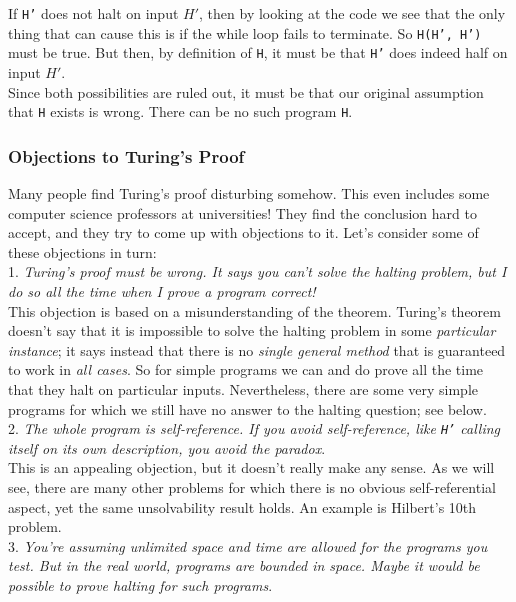 \documentclass[12pt]{article}
\theoremstyle{plain}
\theoremstyle{definition}
\begin{document}
If \texttt{H'} does not halt on input $H'$, then by looking at the code we see that the only thing that can cause this is if the while loop fails to terminate.
So \texttt{H(H', H')} must be true.
But then, by definition of \texttt{H}, it must be that \texttt{H'} does indeed half on input $H'$. \\

Since both possibilities are ruled out, it must be that our original assumption that \texttt{H} exists is wrong.
There can be no such program \texttt{H}.

\subsubsection{Objections to Turing's Proof}
Many people find Turing's proof disturbing somehow. This even includes some computer science professors at universities!
They find the conclusion hard to accept, and they try to come up with objections to it.
Let's consider some of these objections in turn: \\

1. \emph{Turing's proof must be wrong. It says you can't solve the halting problem, but I do so all the time when I prove a program correct!} \\

This objection is based on a misunderstanding of the theorem.
Turing's theorem doesn't say that it is impossible to solve the halting problem in some \emph{particular instance};
it says instead that there is no \emph{single general method} that is guaranteed to work in \emph{all cases}.
So for simple programs we can and do prove all the time that they halt on particular inputs.
Nevertheless, there are some very simple programs for which we still have no answer to the halting question;
see below. \\

2. \emph{The whole program is self-reference. If you avoid self-reference, like \texttt{H'} calling itself on its own description, you avoid the paradox}. \\

This is an appealing objection, but it doesn't really make any sense.
As we will see, there are many other problems for which there is no obvious self-referential aspect, yet the same unsolvability result holds.
An example is Hilbert's 10th problem. \\

3. \emph{You're assuming unlimited space and time are allowed for the programs you test. But in the real world, programs are bounded in space. Maybe it would be possible to prove halting for such programs}. \\
\end{document}
